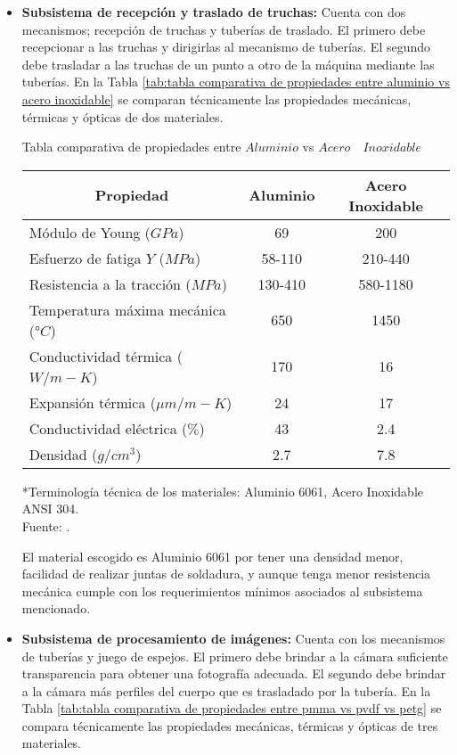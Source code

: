 \begin{itemize}
	\item \textbf{Subsistema de recepción y traslado de truchas:} Cuenta con dos mecanismos; recepción de truchas y tuberías de traslado. El primero debe recepcionar a las truchas y dirigirlas al mecanismo de tuberías. El segundo debe trasladar a las truchas de un punto a otro de la máquina mediante las tuberías. En la Tabla \ref{tab:tabla comparativa de propiedades entre aluminio vs acero inoxidable} se comparan técnicamente las propiedades mecánicas, térmicas y ópticas de dos materiales.
	
	\begin{mytable}[H]
		\centering
		\caption{Tabla comparativa de propiedades entre $Aluminio$ vs $Acero \quad Inoxidable$}
		\label{tab:tabla comparativa de propiedades entre aluminio vs acero inoxidable}
		\begin{tabular}{|l|c|c|}
			\hline
			\multicolumn{1}{|c|}{\textbf{Propiedad}} & \textbf{Aluminio} & \textbf{Acero Inoxidable} \\ \hline
			Módulo de Young ($GPa$) & 69 & 200 \\ \hline
			Esfuerzo de fatiga $Y$ ($MPa$) & 58-110 & 210-440 \\ \hline
			Resistencia a la tracción ($MPa$) & 130-410 & 580-1180 \\ \hline
			Temperatura máxima mecánica (°$C$) & 650 & 1450 \\ \hline
			Conductividad térmica ($W/m-K$) & 170 & 16 \\ \hline
			Expansión térmica (${\mu}m/m-K$) & 24 & 17 \\ \hline
			Conductividad eléctrica ($\%$) & 43 & 2.4 \\ \hline
			Densidad ($g/cm^3$) & 2.7 & 7.8 \\ \hline
		\end{tabular}
		\begin{flushleft}
			*Terminología técnica de los materiales: Aluminio 6061, Acero Inoxidable ANSI 304.\\		
			Fuente: \cite{MakeItFrom2020}.
		\end{flushleft}
	\end{mytable}

	El material escogido es Aluminio 6061 por tener una densidad menor, facilidad de realizar juntas de soldadura, y aunque tenga menor resistencia mecánica cumple con los requerimientos mínimos asociados al subsistema mencionado.
	
	\item \textbf{Subsistema de procesamiento de imágenes:} Cuenta con los mecanismos de tuberías y juego de espejos. El primero debe brindar a la cámara suficiente transparencia para obtener una fotografía adecuada. El segundo debe brindar a la cámara más perfiles del cuerpo que es trasladado por la tubería. En la Tabla \ref{tab:tabla comparativa de propiedades entre pmma vs pvdf vs petg} se compara técnicamente las propiedades mecánicas, térmicas y ópticas de tres materiales.
	

\end{itemize}
